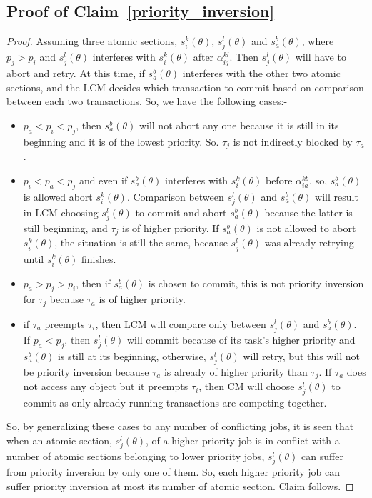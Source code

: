 \documentclass{sig-alternate}
\begin{document}
\subsection{\label{proof_priority_inversion} Proof of Claim~\ref{priority_inversion}}
\begin{proof}
Assuming three atomic sections, $s_i^k(\theta)$, $s_j^l(\theta)$ and $s_a^b(\theta)$, where $p_j > p_i$ and $s_j^l(\theta)$ interferes with $s_i^k(\theta)$ after $\alpha_{ij}^{kl}$. Then $s_j^l(\theta)$ will have to abort and retry. At this time, if $s_a^b(\theta)$ interferes with the other two atomic sections, and the LCM decides which transaction to commit based on comparison between each two transactions. So, we have the following cases:-
\begin{itemize}
\item $p_a < p_i < p_j$, then $s_a^b(\theta)$ will not abort any one because it is still in its beginning and it is of the lowest priority. So. $\tau_j$ is not indirectly blocked by $\tau_a$.
\item $p_i<p_a<p_j$ and even if $s_a^b(\theta)$ interferes with $s_i^k(\theta)$ before $\alpha_{ia}^{kb}$, so, $s_a^b(\theta)$ is allowed abort $s_i^k(\theta)$. Comparison between $s_j^l(\theta)$ and $s_a^b(\theta)$ will result in LCM choosing $s_j^l(\theta)$ to commit and abort $s_a^b(\theta)$ because the latter is still beginning, and $\tau_j$ is of higher priority. If $s_a^b(\theta)$ is not allowed to abort $s_i^k(\theta)$, the situation is still the same, because $s_j^l(\theta)$ was already retrying until $s_i^k(\theta)$ finishes.
\item $p_a>p_j>p_i$, then if $s_a^b(\theta)$ is chosen to commit, this is not priority inversion for $\tau_j$ because $\tau_a$ is of higher priority.
\item if $\tau_a$ preempts $\tau_i$, then LCM will compare only between $s_j^l(\theta)$ and $s_a^b(\theta)$. If $p_a<p_j$, then $s_j^l(\theta)$ will commit because of its task's higher priority and $s_a^b(\theta)$ is still at its beginning, otherwise, $s_j^l(\theta)$ will retry, but this will not be priority inversion because $\tau_a$ is already of higher priority than $\tau_j$. If $\tau_a$ does not access any object but it preempts $\tau_i$, then CM will choose $s_j^l(\theta)$ to commit as only already running transactions are competing together.
\end{itemize}
So, by generalizing these cases to any number of conflicting jobs, it is seen that when an atomic section, $s_j^l(\theta)$, of a higher priority job is in conflict with a number of atomic sections belonging to lower priority jobs, $s_j^l(\theta)$ can suffer from priority inversion by only one of them. So, each higher priority job can suffer priority inversion at most its number of atomic section. Claim follows.
\end{proof}
\end{document}
